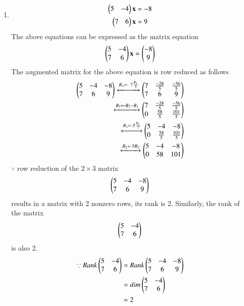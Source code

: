\begin{enumerate}
\item
\begin{align}
\begin{split}
\begin{pmatrix}5 & -4 \end{pmatrix}\mathbf{x}&=-8
\\
\begin{pmatrix}7 & 6 \end{pmatrix}\mathbf{x}&=9
\end{split}
\end{align}
The above equations can be expressed as the matrix equation
\begin{align}
\begin{pmatrix}5 & -4\\7 & 6\end{pmatrix} \mathbf{x} = \begin{pmatrix}-8\\9\end{pmatrix}
\end{align}
%
The augmented matrix for the above equation is row reduced as follows
\begin{align}
\begin{pmatrix}5 & -4 & -8\\7 & 6 & 9\end{pmatrix} 
\xleftrightarrow {R_1\leftarrow \ 7\frac{R_1}{5}}\begin{pmatrix}7 & \frac{-28}{5} & \frac{-56}{5}\\7 & 6 & 9\end{pmatrix} 
\\
\xleftrightarrow {R_2\leftarrow R_2 - R_1}\begin{pmatrix}7 & \frac{-28}{5} &\frac{-56}{5} \\0 & \frac{58}{5} & \frac{101}{5}\end{pmatrix}
\\
\xleftrightarrow {R_1\leftarrow 5\frac{R_1}{7}}\begin{pmatrix}5 & -4 & -8 \\0 & \frac{58}{5} & \frac{101}{5}\end{pmatrix}
\\
\xleftrightarrow {R_2\leftarrow 5R_2}\begin{pmatrix}5 & -4 & -8 \\0 & 58 & 101 \end{pmatrix}
\end{align}
%
$\because$ row reduction of the $2\times 3$ matrix
%
\begin{align}
\begin{pmatrix}5 & -4 & -8\\7 & 6 & 9\end{pmatrix} \label{line/6/2.0.7}
\end{align}
%
results in a matrix with 2 nonzero rows, its rank is 2. 
%
Similarly, the rank of the matrix 
\begin{align}
\begin{pmatrix}5 & -4 \\7 & 6 \end{pmatrix} \label{line/6/2.0.8}
\end{align}
%
is also 2.
%
\begin{align}
\because Rank \begin{pmatrix}5 & -4\\7 & 6\end{pmatrix} &= Rank\begin{pmatrix}5 & -4 & -8\\7 & 6 & 9\end{pmatrix} \nonumber\\
 &=dim \begin{pmatrix}5 & -4\\7 & 6\end{pmatrix}\nonumber\\
 &=2
\end{align}


\end{enumerate}
